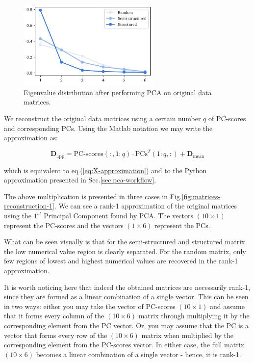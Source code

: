 \documentclass[10pt,twocolumn]{article}
\begin{document}
\begin{figure}[H]
\centering\includegraphics[width=7cm]{matrix-reconstruction-eigenvalues-comparison.png}
\caption{Eigenvalue distribution after performing PCA on original data matrices.}			
\label{fig:eigenvalues}
\end{figure}

We reconstruct the original data matrices using a certain number $q$ of PC-scores and corresponding PCs. Using the Matlab notation we may write the approximation as:

\begin{equation} \label{eq:data-set-approximation}
\bm{D}_{\text{app}} = \text{PC-scores}(:,1:q) \cdot \text{PCs}^T(1:q,:) + \bm{D}_{\text{mean}}
\end{equation}

which is equivalent to eq.(\ref{eq:X-approximation}) and to the Python approximation presented in Sec.\ref{sec:pca-workflow}.

The above multiplication is presented in three cases in Fig.\ref{fig:matrices-reconstruction-1}. We can see a rank-1 approximation of the original matrices using the $1^{st}$ Principal Component found by PCA. The vectors $(10 \times 1)$ represent the PC-scores and the vectors $(1 \times 6)$ represent the PCs.

What can be seen visually is that for the semi-structured and structured matrix the low numerical value region is clearly separated. For the random matrix, only few regions of lowest and highest numerical values are recovered in the rank-1 approximation.


It is worth noticing here that indeed the obtained matrices are necessarily rank-1, since they are formed as a linear combination of a single vector. This can be seen in two ways: either you may take the vector of PC-scores $(10 \times 1)$ and assume that it forms every column of the $(10 \times 6)$ matrix through multiplying it by the corresponding element from the PC vector. Or, you may assume that the PC is a vector that forms every row of the $(10 \times 6)$ matrix when multiplied by the corresponding element from the PC-scores vector. In either case, the full matrix $(10 \times 6)$ becomes a linear combination of a single vector - hence, it is rank-1.
\end{document}
